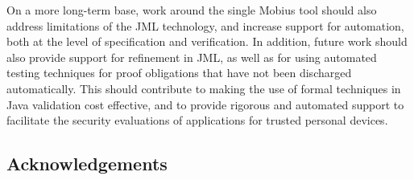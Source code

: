 On a more long-term base, work around the single Mobius tool should
also address limitations of the JML technology, and increase support
for automation, both at the level of specification and
verification. In addition, future work should also provide support for
refinement in JML, as well as for using automated testing techniques
for proof obligations that have not been discharged
automatically. This should contribute to making the use of formal
techniques in Java validation cost effective, and to provide rigorous
and automated support to facilitate the security evaluations of 
applications for trusted personal devices.

\subsection*{Acknowledgements}
